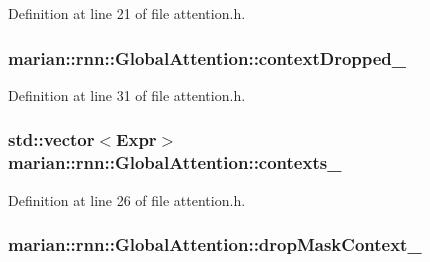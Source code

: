 Definition at line 21 of file attention.\+h.

\subsubsection[{\texorpdfstring{context\+Dropped\+\_\+}{contextDropped_}}]{ marian\+::rnn\+::\+Global\+Attention\+::context\+Dropped\+\_\+\hspace{0.3cm}{\ttfamily [private]}}\hypertarget{classmarian_1_1rnn_1_1GlobalAttention_af2d8e79f08edb6846b5e645928ddf60d}{}\label{classmarian_1_1rnn_1_1GlobalAttention_af2d8e79f08edb6846b5e645928ddf60d}


Definition at line 31 of file attention.\+h.

\subsubsection[{\texorpdfstring{contexts\+\_\+}{contexts_}}]{\setlength{\rightskip}{0pt plus 5cm}std\+::vector$<${\bf Expr}$>$ marian\+::rnn\+::\+Global\+Attention\+::contexts\+\_\+\hspace{0.3cm}{\ttfamily [private]}}\hypertarget{classmarian_1_1rnn_1_1GlobalAttention_ad5499538c0b64f796c0b815f6a8654e5}{}\label{classmarian_1_1rnn_1_1GlobalAttention_ad5499538c0b64f796c0b815f6a8654e5}


Definition at line 26 of file attention.\+h.

\subsubsection[{\texorpdfstring{drop\+Mask\+Context\+\_\+}{dropMaskContext_}}]{ marian\+::rnn\+::\+Global\+Attention\+::drop\+Mask\+Context\+\_\+\hspace{0.3cm}{\ttfamily [private]}}\hypertarget{classmarian_1_1rnn_1_1GlobalAttention_aeebe2fffa0a2305bef2a26ff292201f4}{}\label{classmarian_1_1rnn_1_1GlobalAttention_aeebe2fffa0a2305bef2a26ff292201f4}


